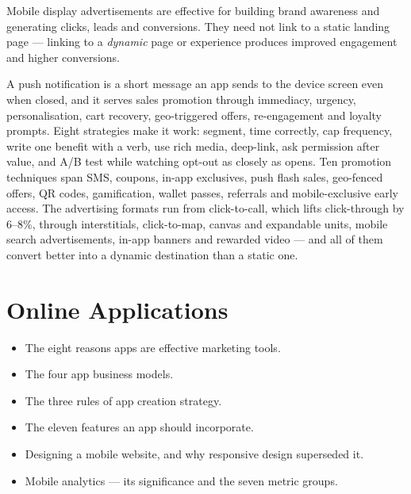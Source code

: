 \begin{keybox}
Mobile display advertisements are effective for building brand awareness and
generating clicks, leads and conversions. They need not link to a static landing
page --- linking to a \emph{dynamic} page or experience produces improved
engagement and higher conversions.
\end{keybox}

\begin{summarybox}
A push notification is a short message an app sends to the device screen even when
closed, and it serves sales promotion through immediacy, urgency,
personalisation, cart recovery, geo-triggered offers, re-engagement and loyalty
prompts. Eight strategies make it work: segment, time correctly, cap frequency,
write one benefit with a verb, use rich media, deep-link, ask permission after
value, and A/B test while watching opt-out as closely as opens. Ten promotion
techniques span SMS, coupons, in-app exclusives, push flash sales, geo-fenced
offers, QR codes, gamification, wallet passes, referrals and mobile-exclusive
early access. The advertising formats run from click-to-call, which lifts
click-through by 6--8\%, through interstitials, click-to-map, canvas and
expandable units, mobile search advertisements, in-app banners and rewarded video
--- and all of them convert better into a dynamic destination than a static one.
\end{summarybox}

\chapter{Online Applications}


\begin{learningoutcomes}
\begin{itemize}
\item The eight reasons apps are effective marketing tools.
\item The four app business models.
\item The three rules of app creation strategy.
\item The eleven features an app should incorporate.
\item Designing a mobile website, and why responsive design superseded it.
\item Mobile analytics --- its significance and the seven metric groups.
\end{itemize}
\end{learningoutcomes}

